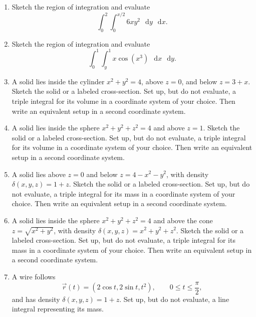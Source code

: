 \documentclass[12pt,letterpaper]{article}
\newcommand{\dd}{\mathop{}\!\mathrm{d}}
\begin{document}
\begin{enumerate}[label=\arabic*.,leftmargin=2em,labelsep=0.6em,
                  itemsep=1.1em,parsep=0pt,topsep=0pt]

\item Sketch the region of integration and evaluate
\[
  \int_0^2\int_0^{x/2}6xy^2\,\dd y\,\dd x.
\]

\item Sketch the region of integration and evaluate
\[
  \int_0^1\int_y^1 x\cos(x^3)\,\dd x\,\dd y.
\]

\item A solid lies inside the cylinder $x^2+y^2=4$, above $z=0$, and
below $z=3+x$. Sketch the solid or a labeled cross-section. Set up,
but do not evaluate, a triple integral for its volume in a coordinate
system of your choice. Then write an equivalent setup in a second
coordinate system.

\item A solid lies inside the sphere $x^2+y^2+z^2=4$ and above $z=1$.
Sketch the solid or a labeled cross-section. Set up, but do not evaluate,
a triple integral for its volume in a coordinate system of your choice.
Then write an equivalent setup in a second coordinate system.

\item A solid lies above $z=0$ and below $z=4-x^2-y^2$, with density
$\delta(x,y,z)=1+z$. Sketch the solid or a labeled cross-section.
Set up, but do not evaluate, a triple integral for its mass in a
coordinate system of your choice. Then write an equivalent setup in
a second coordinate system.

\item A solid lies inside the sphere $x^2+y^2+z^2=4$ and above the
cone $z=\sqrt{x^2+y^2}$, with density
$\delta(x,y,z)=x^2+y^2+z^2$. Sketch the solid or a labeled cross-section.
Set up, but do not evaluate, a triple integral for its mass in a
coordinate system of your choice. Then write an equivalent setup in
a second coordinate system.

\item A wire follows
\[
  \vec r(t)=(2\cos t,2\sin t,t^2),\qquad 0\leq t\leq\frac\pi2,
\]
and has density $\delta(x,y,z)=1+z$. Set up, but do not evaluate,
a line integral representing its mass.


\end{enumerate}
\end{document}
